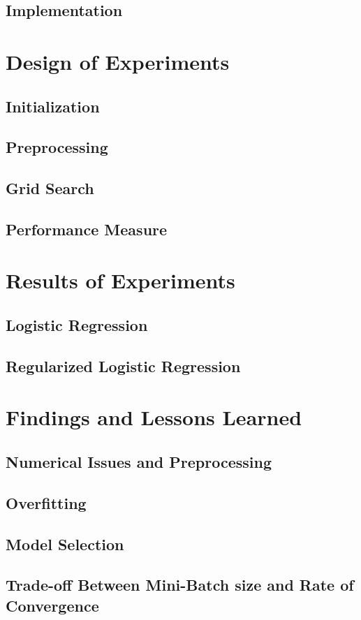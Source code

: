 \documentclass[twoside,12pt]{article}
\begin{document}
\subsection{Implementation}

\section{Design of Experiments}
\subsection{Initialization}
\subsection{Preprocessing}
\subsection{Grid Search}
\subsection{Performance Measure}

\section{Results of Experiments}
\subsection{Logistic Regression}
\subsection{Regularized Logistic Regression}

\section{Findings and Lessons Learned}
\subsection{Numerical Issues and Preprocessing}
\subsection{Overfitting}
\subsection{Model Selection}
\subsection{Trade-off Between Mini-Batch size and Rate of Convergence}
\end{document}
